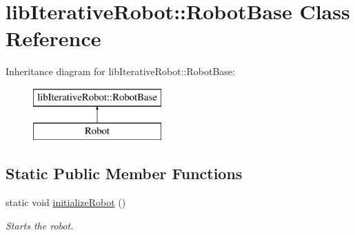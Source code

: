 \hypertarget{classlib_iterative_robot_1_1_robot_base}{}\section{lib\+Iterative\+Robot\+::Robot\+Base Class Reference}
\label{classlib_iterative_robot_1_1_robot_base}
Inheritance diagram for lib\+Iterative\+Robot\+::Robot\+Base\+:\begin{figure}[H]
\begin{center}
\leavevmode
\includegraphics[height=2.000000cm]{classlib_iterative_robot_1_1_robot_base}
\end{center}
\end{figure}
\subsection*{Static Public Member Functions}
\begin{DoxyCompactItemize}
\item 
static void \mbox{\hyperlink{classlib_iterative_robot_1_1_robot_base_aaefe1d1083d84c855750bb8e3d52b0ac}{initialize\+Robot}} ()
\begin{DoxyCompactList}\small\item\em Starts the robot. \end{DoxyCompactList}\end{DoxyCompactItemize}
